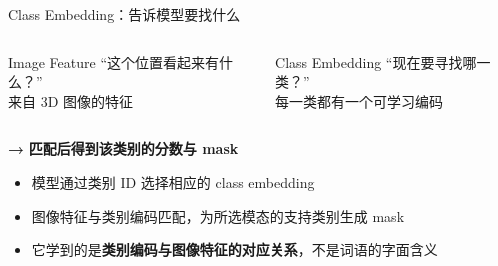 \documentclass[aspectratio=169,12pt]{beamer}
\newcommand{\key}[1]{\textcolor{BeamerRoyal}{\textbf{#1}}}
\newcommand{\bigarrow}{\textcolor{BeamerRoyal}{\large\bfseries →}}
\begin{document}
\begin{frame}{Class Embedding：告诉模型要找什么}
  \begin{columns}[T,onlytextwidth]
      \begin{block}{Image Feature}
        \centering
        “这个位置看起来有什么？”\\[0.10cm]
        {\small 来自 3D 图像的特征}
      \end{block}
      \begin{block}{Class Embedding}
        \centering
        “现在要寻找哪一类？”\\[0.10cm]
        {\small 每一类都有一个可学习编码}
      \end{block}
  \end{columns}

  \vspace{0.14cm}
  \begin{center}
    \bigarrow\quad
    \textbf{匹配后得到该类别的分数与 mask}
  \end{center}

  \begin{itemize}
    \item 模型通过类别 ID 选择相应的 class embedding
    \item 图像特征与类别编码匹配，为所选模态的支持类别生成 mask
    \item 它学到的是\key{类别编码与图像特征的对应关系}，不是词语的字面含义
  \end{itemize}
\end{frame}
\end{document}
